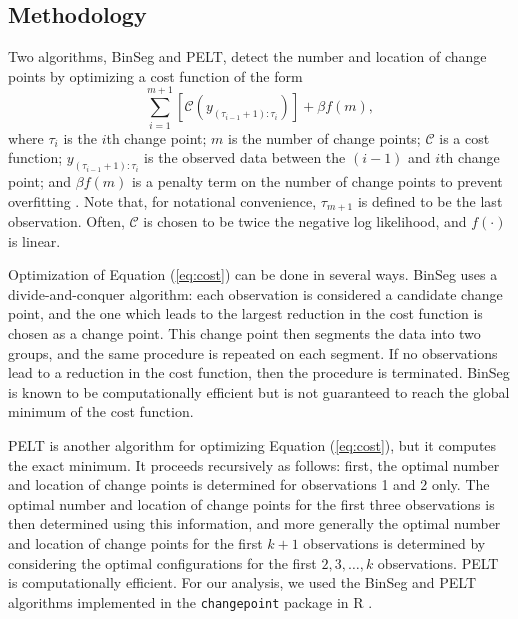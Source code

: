 \documentclass[12pt]{article}
\begin{document}
\begin{doublespacing}
\subsection{Methodology}
\label{ssec:methodology}

Two algorithms, BinSeg and PELT, detect the number and location of change points by optimizing a cost function of the form
\begin{equation}
	\sum_{i=1}^{m+1} [\mathcal{C}(y_{(\tau_{i-1}+1):\tau_i})] + \beta f(m),
	\label{eq:cost}
\end{equation}
where $\tau_i$ is the $i$th change point; $m$ is the number of change points; $\mathcal{C}$ is a cost function; $y_{(\tau_{i-1}+1):\tau_i}$ is the observed data between the $(i-1)$ and $i$th change point; and $\beta f(m)$ is a penalty term on the number of change points to prevent overfitting \cite{killick12}.  Note that, for notational convenience, $\tau_{m+1}$ is defined to be the last observation.  Often, $\mathcal{C}$ is chosen to be twice the negative log likelihood, and $f(\cdot)$ is linear.

Optimization of Equation (\ref{eq:cost}) can be done in several ways.  BinSeg uses a divide-and-conquer algorithm: each observation is considered a candidate change point, and the one which leads to the largest reduction in the cost function is chosen as a change point.  This change point then segments the data into two groups, and the same procedure is repeated on each segment.  If no observations lead to a reduction in the cost function, then the procedure is terminated.  BinSeg is known to be computationally efficient but is not guaranteed to reach the global minimum of the cost function.

PELT is another algorithm for optimizing Equation (\ref{eq:cost}), but it computes the exact minimum.  It proceeds recursively as follows: first, the optimal number and location of change points is determined for observations 1 and 2 only.  The optimal number and location of change points for the first three observations is then determined using this information, and more generally the optimal number and location of change points for the first $k+1$ observations is determined by considering the optimal configurations for the first $2, 3, \ldots, k$ observations.  PELT is computationally efficient.  For our analysis, we used the BinSeg and PELT algorithms implemented in the \texttt{changepoint} package in R \cite{killick14}.


\end{doublespacing}
\end{document}
